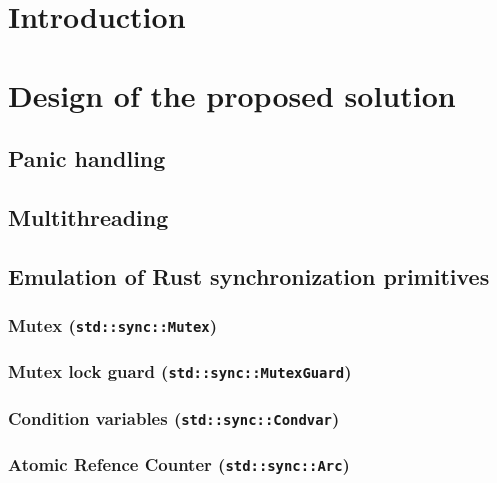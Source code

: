 \documentclass[12pt, oneside]{book}
\begin{document}




\chapter{Introduction}










\chapter{Design of the proposed solution}








\section{Panic handling}
\section{Multithreading}
\section{Emulation of Rust synchronization primitives}

\subsection{Mutex (\texttt{std::sync::Mutex})}
\subsection{Mutex lock guard (\texttt{std::sync::MutexGuard})}
\subsection{Condition variables (\texttt{std::sync::Condvar})}
\subsection{Atomic Refence Counter (\texttt{std::sync::Arc})}
\end{document}
